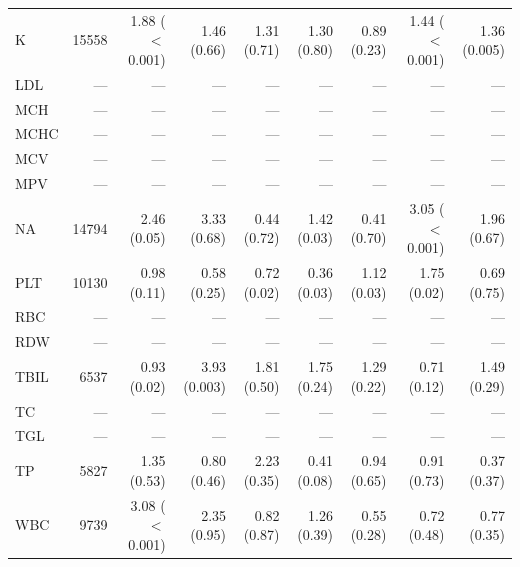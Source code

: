 \begin{table}[ht]
\begin{tabular}{lrrrrrrrr}
K & 15558 & 1.88 ($<$0.001) & 1.46 (0.66) & 1.31 (0.71) & 1.30 (0.80) & 0.89 (0.23) & 1.44 ($<$0.001) & 1.36 (0.005) \\
LDL & --- & --- & --- & --- & --- & --- & --- & --- \\
MCH & --- & --- & --- & --- & --- & --- & --- & --- \\
MCHC & --- & --- & --- & --- & --- & --- & --- & --- \\
MCV & --- & --- & --- & --- & --- & --- & --- & --- \\
MPV & --- & --- & --- & --- & --- & --- & --- & --- \\
NA & 14794 & 2.46 (0.05) & 3.33 (0.68) & 0.44 (0.72) & 1.42 (0.03) & 0.41 (0.70) & 3.05 ($<$0.001) & 1.96 (0.67) \\
PLT & 10130 & 0.98 (0.11) & 0.58 (0.25) & 0.72 (0.02) & 0.36 (0.03) & 1.12 (0.03) & 1.75 (0.02) & 0.69 (0.75) \\
RBC & --- & --- & --- & --- & --- & --- & --- & --- \\
RDW & --- & --- & --- & --- & --- & --- & --- & --- \\
TBIL & 6537 & 0.93 (0.02) & 3.93 (0.003) & 1.81 (0.50) & 1.75 (0.24) & 1.29 (0.22) & 0.71 (0.12) & 1.49 (0.29) \\
TC & --- & --- & --- & --- & --- & --- & --- & --- \\
TGL & --- & --- & --- & --- & --- & --- & --- & --- \\
TP & 5827 & 1.35 (0.53) & 0.80 (0.46) & 2.23 (0.35) & 0.41 (0.08) & 0.94 (0.65) & 0.91 (0.73) & 0.37 (0.37) \\
WBC & 9739 & 3.08 ($<$0.001) & 2.35 (0.95) & 0.82 (0.87) & 1.26 (0.39) & 0.55 (0.28) & 0.72 (0.48) & 0.77 (0.35) \\
\bottomrule
\end{tabular}
\label{tab:17_incidence_inspire_unplanned_icu}
\end{table}